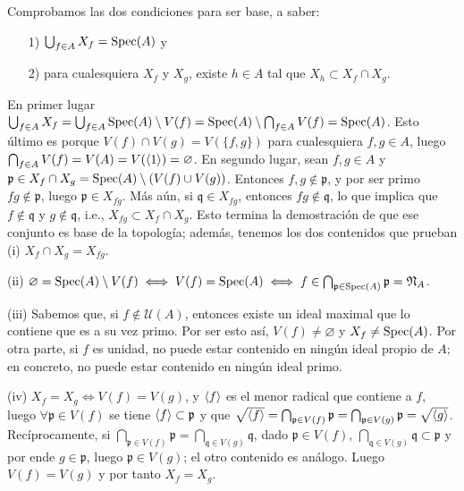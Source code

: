 \documentclass[../main.tex]{subfiles}
\begin{document}
Comprobamos las dos condiciones para ser base, a saber:
\begin{itemize}
    \item[1)] $\bigcup_{f\in A}X_f=\text{Spec}(A)$ y
    \item[2)] para cualesquiera $X_f$ y $X_g$, existe $h\in A$ tal que $X_h\subset X_f\cap X_g$.
\end{itemize}
En primer lugar $\bigcup_{f\in A}X_f = \bigcup_{f\in A}\text{Spec}(A) \setminus V(f) = \text{Spec}(A) \setminus \bigcap_{f\in A}V(f) = \text{Spec}(A)$. Esto último es porque $V(f)\cap V(g) = V(\{f,g\})$ para cualesquiera $f,g \in A$, luego $\bigcap_{f\in A}V(f) = V(A) = V(\langle 1 \rangle) = \varnothing$. En segundo lugar, sean $f, g \in A$ y $\mathfrak p \in X_f\cap X_g = \text{Spec}(A) \setminus (V(f) \cup V(g))$. Entonces $f, g\not\in \mathfrak p$, y por ser primo $fg \not \in \mathfrak p$, luego $\mathfrak p \in X_{fg}$. Más aún, si $\mathfrak q \in X_{fg}$, entonces $fg \not \in \mathfrak q$, lo que implica que $f \not \in \mathfrak q$ y $g \not \in \mathfrak q$, i.e., $X_{fg} \subset X_f \cap X_g$. Esto termina la demostración de que ese conjunto es base de la topología; además, tenemos los dos contenidos que prueban (i) $X_f \cap X_g = X_{fg}$.

(ii) $\varnothing = \text{Spec}(A) \setminus V(f) \iff V(f) = \text{Spec}(A) \iff f \in \bigcap_{\mathfrak p \in \text{Spec}(A)} \mathfrak p = \mathfrak N_A$.

(iii) Sabemos que, si $f\not\in \mathcal U(A)$, entonces existe un ideal maximal que lo contiene que es a su vez primo. Por ser esto así, $V(f)\neq\varnothing$ y $X_f\neq \text{Spec}(A)$. Por otra parte, si $f$ es unidad, no puede estar contenido en ningún ideal propio de $A$; en concreto, no puede estar contenido en ningún ideal primo.


(iv) $X_f = X_g \iff V(f) = V(g)$, y $\langle f \rangle$ es el menor radical que contiene a $f$, luego $\forall \mathfrak p \in V(f)$ se tiene $\langle f \rangle \subset \mathfrak p$ y que $\sqrt{\langle f \rangle} = \bigcap_{\mathfrak p \in V(f)} \mathfrak p = \bigcap_{\mathfrak p \in V(g)} \mathfrak{p} = \sqrt{\langle g \rangle}$.
Recíprocamente, si $\bigcap_{\mathfrak p \in V(f)} \mathfrak p = \bigcap_{\mathfrak q \in V(g)} \mathfrak{q}$, dado $\mathfrak p \in V(f)$, $ \bigcap_{\mathfrak{q} \in V(g)} \mathfrak{q} \subset \mathfrak{p}$ y por ende $g \in \mathfrak p$, luego $\mathfrak p \in V(g)$; el otro contenido es análogo. Luego $V(f) = V(g)$ y por tanto $X_f = X_g$.
\end{document}
